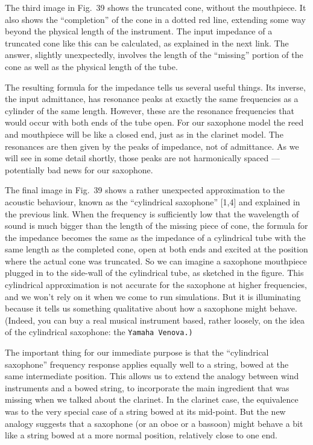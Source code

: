   The third image in Fig.\ 39 shows the truncated cone, without the mouthpiece. 
  It also shows the “completion” of the cone in a dotted red line, extending 
  some way beyond the physical length of the instrument. The input impedance of 
  a truncated cone like this can be calculated, as explained in the next link. 
  The answer, slightly unexpectedly, involves the length of the “missing” 
  portion of the cone as well as the physical length of the tube. 

  The resulting formula for the impedance tells us several useful things. Its 
  inverse, the input admittance, has resonance peaks at exactly the same 
  frequencies as a cylinder of the same length. However, these are the 
  resonance frequencies that would occur with both ends of the tube open. For 
  our saxophone model the reed and mouthpiece will be like a closed end, just 
  as in the clarinet model. The resonances are then given by the peaks of 
  impedance, not of admittance. As we will see in some detail shortly, those 
  peaks are not harmonically spaced — potentially bad news for our saxophone. 

  The final image in Fig.\ 39 shows a rather unexpected approximation to the 
  acoustic behaviour, known as the “cylindrical saxophone” [1,4] and explained 
  in the previous link. When the frequency is sufficiently low that the 
  wavelength of sound is much bigger than the length of the missing piece of 
  cone, the formula for the impedance becomes the same as the impedance of a 
  cylindrical tube with the same length as the completed cone, open at both 
  ends and excited at the position where the actual cone was truncated. So we 
  can imagine a saxophone mouthpiece plugged in to the side-wall of the 
  cylindrical tube, as sketched in the figure. This cylindrical approximation 
  is not accurate for the saxophone at higher frequencies, and we won’t rely on 
  it when we come to run simulations. But it is illuminating because it tells 
  us something qualitative about how a saxophone might behave. (Indeed, you can 
  buy a real musical instrument based, rather loosely, on the idea of the 
  cylindrical saxophone: the \tt{}Yamaha Venova\rm{}.) 

  The important thing for our immediate purpose is that the “cylindrical 
  saxophone” frequency response applies equally well to a string, bowed at the 
  same intermediate position. This allows us to extend the analogy between wind 
  instruments and a bowed string, to incorporate the main ingredient that was 
  missing when we talked about the clarinet. In the clarinet case, the 
  equivalence was to the very special case of a string bowed at its mid-point. 
  But the new analogy suggests that a saxophone (or an oboe or a bassoon) might 
  behave a bit like a string bowed at a more normal position, relatively close 
  to one end. 

